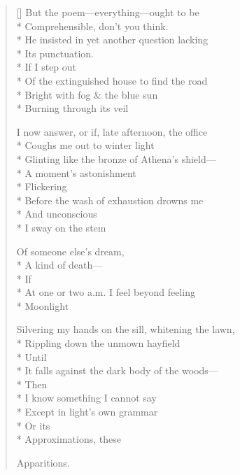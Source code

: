 \label{ch:punctuation}
\settowidth{\versewidth}{                                                          Until }
\begin{verse}[\versewidth]
But the poem---everything---ought to be\\*
Comprehensible, don't you think.\\*
He insisted in yet another question lacking\\*
Its punctuation.   \\*
                           If I step out\\*
Of the extinguished house to find the road\\*
Bright with fog \& the blue sun\\*
Burning through its veil

I now answer, or if, late afternoon, the office\\*
Coughs me out to winter light\\*
Glinting like the bronze of Athena's shield---\\*
A moment's astonishment \\*
                                         Flickering\\*
Before the wash of exhaustion drowns me\\*
And unconscious \\*
I sway on the stem

Of someone else's dream,\\*
A kind of death---\\*
                                If\\*
At one or two a.m. I feel beyond feeling\\*
Moonlight

Silvering my hands on the sill, whitening the lawn,\\*
Rippling down the unmown hayfield     \\*
                                                          Until \\*
It falls against the dark body of the woods---\\*
Then\\*
              I know something I cannot say\\*
Except in light's own grammar\\*
                                                  Or its\\*
Approximations, these

Apparitions.
\end{verse}
